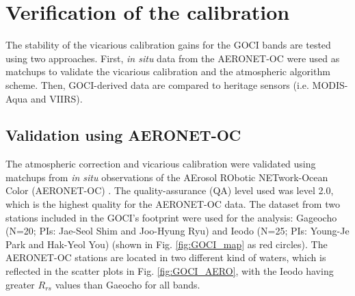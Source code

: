 \documentclass[10pt]{article}
\begin{document}

\section{Verification of the calibration}
The stability of the vicarious calibration gains for the GOCI bands are tested using two approaches. First, {\it in situ} data from the AERONET-OC were used as matchups to validate the vicarious calibration and the atmospheric algorithm scheme. Then, GOCI-derived data are compared to heritage sensors (i.e. MODIS-Aqua and VIIRS).
\subsection{Validation using AERONET-OC}
The atmospheric correction and vicarious calibration were validated using matchups from {\it in situ} observations of the AErosol RObotic NETwork-Ocean Color (AERONET-OC) \cite{Zibordi2009}. The quality-assurance (QA) level used was level 2.0, which is the highest quality for the AERONET-OC data. The dataset from two stations included in the GOCI's footprint were used for the analysis: Gageocho (N=20; PIs: Jae-Seol Shim and Joo-Hyung Ryu) and Ieodo (N=25; PIs: Young-Je Park and Hak-Yeol You) (shown in Fig. \ref{fig:GOCI_map} as red circles). The AERONET-OC stations are located in two different kind of waters, which is reflected in the scatter plots in Fig. \ref{fig:GOCI_AERO}, with the Ieodo having greater $R_{rs}$ values than Gaeocho for all bands.
\end{document}
